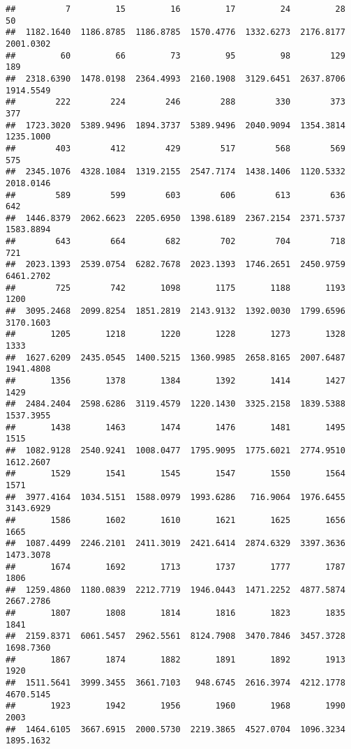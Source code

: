 \documentclass[
]{article}
\begin{document}
\begin{verbatim}
##          7         15         16         17         24         28         50 
##  1182.1640  1186.8785  1186.8785  1570.4776  1332.6273  2176.8177  2001.0302 
##         60         66         73         95         98        129        189 
##  2318.6390  1478.0198  2364.4993  2160.1908  3129.6451  2637.8706  1914.5549 
##        222        224        246        288        330        373        377 
##  1723.3020  5389.9496  1894.3737  5389.9496  2040.9094  1354.3814  1235.1000 
##        403        412        429        517        568        569        575 
##  2345.1076  4328.1084  1319.2155  2547.7174  1438.1406  1120.5332  2018.0146 
##        589        599        603        606        613        636        642 
##  1446.8379  2062.6623  2205.6950  1398.6189  2367.2154  2371.5737  1583.8894 
##        643        664        682        702        704        718        721 
##  2023.1393  2539.0754  6282.7678  2023.1393  1746.2651  2450.9759  6461.2702 
##        725        742       1098       1175       1188       1193       1200 
##  3095.2468  2099.8254  1851.2819  2143.9132  1392.0030  1799.6596  3170.1603 
##       1205       1218       1220       1228       1273       1328       1333 
##  1627.6209  2435.0545  1400.5215  1360.9985  2658.8165  2007.6487  1941.4808 
##       1356       1378       1384       1392       1414       1427       1429 
##  2484.2404  2598.6286  3119.4579  1220.1430  3325.2158  1839.5388  1537.3955 
##       1438       1463       1474       1476       1481       1495       1515 
##  1082.9128  2540.9241  1008.0477  1795.9095  1775.6021  2774.9510  1612.2607 
##       1529       1541       1545       1547       1550       1564       1571 
##  3977.4164  1034.5151  1588.0979  1993.6286   716.9064  1976.6455  3143.6929 
##       1586       1602       1610       1621       1625       1656       1665 
##  1087.4499  2246.2101  2411.3019  2421.6414  2874.6329  3397.3636  1473.3078 
##       1674       1692       1713       1737       1777       1787       1806 
##  1259.4860  1180.0839  2212.7719  1946.0443  1471.2252  4877.5874  2667.2786 
##       1807       1808       1814       1816       1823       1835       1841 
##  2159.8371  6061.5457  2962.5561  8124.7908  3470.7846  3457.3728  1698.7360 
##       1867       1874       1882       1891       1892       1913       1920 
##  1511.5641  3999.3455  3661.7103   948.6745  2616.3974  4212.1778  4670.5145 
##       1923       1942       1956       1960       1968       1990       2003 
##  1464.6105  3667.6915  2000.5730  2219.3865  4527.0704  1096.3234  1895.1632 

\end{verbatim}
\end{document}
